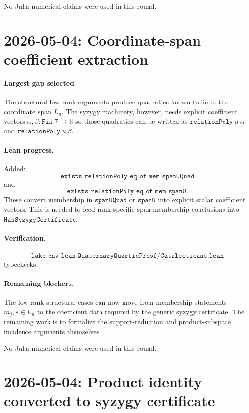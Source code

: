 \documentclass[11pt]{article}
\begin{document}
No Julia numerical claims were used in this round.

\section*{2026-05-04: Coordinate-span coefficient extraction}

\paragraph{Largest gap selected.}
The structural low-rank arguments produce quadratics known to lie in the
coordinate span \(L_u\).  The syzygy machinery, however, needs explicit
coefficient vectors \(\alpha,\beta:\texttt{Fin 7}\to\mathbb R\) so those
quadratics can be written as \(\texttt{relationPoly}\ u\ \alpha\) and
\(\texttt{relationPoly}\ u\ \beta\).

\paragraph{Lean progress.}
Added:
\[
\texttt{exists\_relationPoly\_eq\_of\_mem\_spanUQuad}
\]
and
\[
\texttt{exists\_relationPoly\_eq\_of\_mem\_spanU}.
\]
These convert membership in \(\texttt{spanUQuad}\) or \(\texttt{spanU}\) into
explicit scalar coefficient vectors.  This is needed to feed rank-specific
span membership conclusions into \(\texttt{HasSyzygyCertificate}\).

\paragraph{Verification.}
\[
\texttt{lake env lean QuaternaryQuarticProof/Catalecticant.lean}
\]
typechecks.

\paragraph{Remaining blockers.}
The low-rank structural cases can now move from membership statements
\(m_j,s\in L_u\) to the coefficient data required by the generic syzygy
certificate.  The remaining work is to formalize the support-reduction and
product-subspace incidence arguments themselves.

No Julia numerical claims were used in this round.

\section*{2026-05-04: Product identity converted to syzygy certificate}
\end{document}

